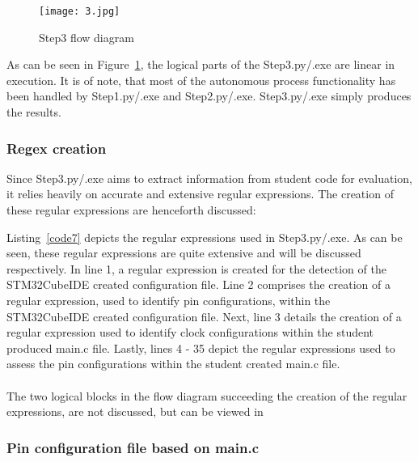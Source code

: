 \begin{figure}[H]
\begin{center}
\texttt{[image: 3.jpg]}
\caption{Step3 flow diagram}
\label{3}
\end{center}
\end{figure}

As can be seen in Figure~\ref{3}, the logical parts of the Step3.py/.exe are linear in execution. It is of note, that most of the autonomous process functionality has been handled by Step1.py/.exe and Step2.py/.exe. Step3.py/.exe simply produces the results.

\subsubsection{Regex creation}
\label{regCre}
Since Step3.py/.exe aims to extract information from student code for evaluation, it relies heavily on accurate and extensive regular expressions. The creation of these regular expressions are henceforth discussed:



Listing~\ref{code7} depicts the regular expressions used in Step3.py/.exe. As can be seen, these regular expressions are quite extensive and will be discussed respectively. In line 1, a regular expression is created for the detection of the STM32CubeIDE created configuration file. Line 2 comprises the creation of a regular expression, used to identify pin configurations, within the STM32CubeIDE created configuration file. Next, line 3 details the creation of a regular expression used to identify clock configurations within the student produced main.c file. Lastly, lines 4 - 35 depict the regular expressions used to assess the pin configurations within the student created main.c file. 
\\\\
The two logical blocks in the flow diagram succeeding the creation of the regular expressions, are not discussed, but can be viewed in \textbf{}

\subsubsection{Pin configuration file based on main.c}
\label{pinConMain.c}


